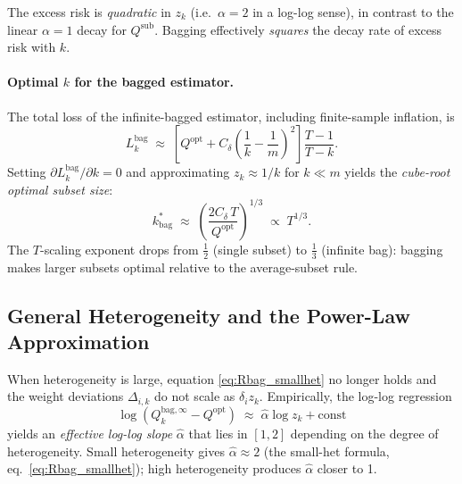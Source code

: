 \documentclass[12pt,a4paper]{article}
\begin{document}
The excess risk is \emph{quadratic} in $z_k$ (i.e.\ $\alpha = 2$ in a
log-log sense), in contrast to the linear $\alpha = 1$ decay for $Q^{\mathrm{sub}}$.
Bagging effectively \emph{squares} the decay rate of excess risk with $k$.

\paragraph{Optimal $k$ for the bagged estimator.}
The total loss of the infinite-bagged estimator, including finite-sample
inflation, is
\begin{equation}\label{eq:Lbag}
L_k^{\mathrm{bag}} \;\approx\;
\left[Q^{\mathrm{opt}} + C_\delta\!\left(\frac{1}{k}-\frac{1}{m}\right)^{\!2}\right]
\frac{T-1}{T-k}.
\end{equation}
Setting $\partial L_k^{\mathrm{bag}}/\partial k = 0$ and approximating
$z_k \approx 1/k$ for $k \ll m$ yields the \emph{cube-root optimal subset size}:
\begin{equation}\label{eq:kstar_bag}
k^*_{\mathrm{bag}} \;\approx\; \left(\frac{2C_\delta\,T}{Q^{\mathrm{opt}}}\right)^{1/3}
\;\propto\; T^{1/3}.
\end{equation}
The $T$-scaling exponent drops from $\tfrac{1}{2}$ (single subset) to
$\tfrac{1}{3}$ (infinite bag): bagging makes larger subsets optimal relative
to the average-subset rule.

\subsection{General Heterogeneity and the Power-Law Approximation}

When heterogeneity is large, equation \eqref{eq:Rbag_smallhet} no longer
holds and the weight deviations $\Delta_{i,k}$ do not scale as $\delta_i z_k$.
Empirically, the log-log regression
\begin{equation}\label{eq:loglog}
\log\!\left(Q_k^{\mathrm{bag},\infty} - Q^{\mathrm{opt}}\right)
\;\approx\; \hat\alpha \log z_k + \mathrm{const}
\end{equation}
yields an \emph{effective log-log slope} $\hat\alpha$ that lies in $[1,2]$
depending on the degree of heterogeneity.
Small heterogeneity gives $\hat\alpha \approx 2$ (the small-het formula,
eq.~\eqref{eq:Rbag_smallhet}); high heterogeneity produces $\hat\alpha$
closer to 1.
\end{document}
